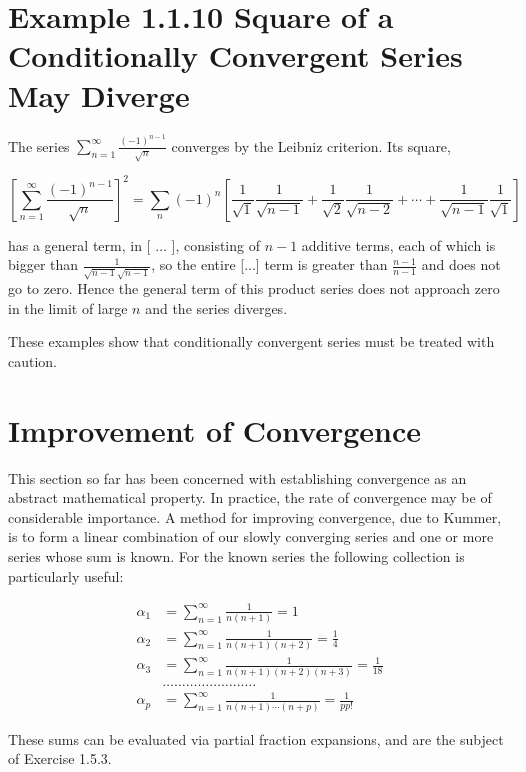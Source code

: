\documentclass[10pt]{article}
\begin{document}
\section*{Example 1.1.10 Square of a Conditionally Convergent Series May Diverge}
The series $\sum_{n=1}^{\infty} \frac{(-1)^{n-1}}{\sqrt{n}}$ converges by the Leibniz criterion. Its square,

$$
\left[\sum_{n=1}^{\infty} \frac{(-1)^{n-1}}{\sqrt{n}}\right]^{2}=\sum_{n}(-1)^{n}\left[\frac{1}{\sqrt{1}} \frac{1}{\sqrt{n-1}}+\frac{1}{\sqrt{2}} \frac{1}{\sqrt{n-2}}+\cdots+\frac{1}{\sqrt{n-1}} \frac{1}{\sqrt{1}}\right]
$$

has a general term, in [ $\ldots$ ], consisting of $n-1$ additive terms, each of which is bigger than $\frac{1}{\sqrt{n-1} \sqrt{n-1}}$, so the entire [...] term is greater than $\frac{n-1}{n-1}$ and does not go to zero. Hence the general term of this product series does not approach zero in the limit of large $n$ and the series diverges.

These examples show that conditionally convergent series must be treated with caution.

\section*{Improvement of Convergence}
This section so far has been concerned with establishing convergence as an abstract mathematical property. In practice, the rate of convergence may be of considerable importance. A method for improving convergence, due to Kummer, is to form a linear combination of our slowly converging series and one or more series whose sum is known. For the known series the following collection is particularly useful:


\begin{align*}
\alpha_{1} & =\sum_{n=1}^{\infty} \frac{1}{n(n+1)}=1 \\
\alpha_{2} & =\sum_{n=1}^{\infty} \frac{1}{n(n+1)(n+2)}=\frac{1}{4} \\
\alpha_{3} & =\sum_{n=1}^{\infty} \frac{1}{n(n+1)(n+2)(n+3)}=\frac{1}{18} \\
& \ldots \ldots \ldots \ldots \ldots \ldots \ldots \ldots  \tag{1.26}\\
\alpha_{p} & =\sum_{n=1}^{\infty} \frac{1}{n(n+1) \cdots(n+p)}=\frac{1}{p p!}
\end{align*}


These sums can be evaluated via partial fraction expansions, and are the subject of Exercise 1.5.3.
\end{document}
